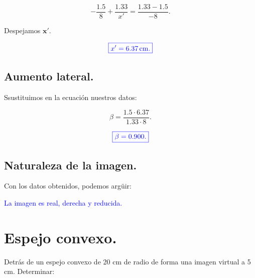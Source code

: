 \documentclass[a4paper,12pt]{article} %
\begin{document}
\[- \frac{1.5}{8} + \frac{1.33}{x'} = \frac{1.33 - 1.5}{-8}. \]

\begin{justify}
	Despejamos \( \mathbf{x'}\).
\end{justify}

\[ \textcolor{blue}{\boxed{x' = 6.37 \, \mathrm{cm}.}} \]

\vspace{\baselineskip}

\subsection{Aumento lateral.}

\begin{justify}
	Ssustituimos en la ecuación nuestros datos:
\end{justify}

\[ \beta = \frac{1.5 \cdot 6.37}{1.33 \cdot 8}. \]

\vspace{\baselineskip}

\[\textcolor{blue}{\boxed{\beta = 0.900. }}\]

\vspace{\baselineskip}

\subsection{Naturaleza de la imagen.}

\begin{justify}
	Con los datos obtenidos, podemos argüir:
\end{justify}

\vspace{\baselineskip}

\begin{justify}
	\centering
	\textcolor{blue}{La imagen es real, derecha y reducida.}	
\end{justify}


\vspace{\baselineskip}

\section{Espejo convexo.}

\begin{justify}
	Detrás de un espejo convexo de 20 cm de radio de forma una imagen virtual a 5 cm. Determinar:
\end{justify}
\end{document}
